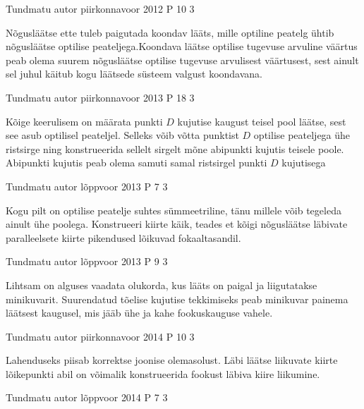 \documentclass[11pt]{article}
\begin{document}
{%
{Tundmatu autor} %
{piirkonnavoor} %
{2012} %
{P 10} %
{3} %
{

\ifHint
Nõgusläätse ette tuleb paigutada koondav lääts, mille optiline peatelg ühtib nõgusläätse optilise peateljega.Koondava läätse optilise tugevuse arvuline väärtus peab olema suurem nõgusläätse optilise tugevuse arvulisest väärtusest, sest ainult sel juhul käitub kogu läätsede süsteem valgust koondavana.
\fi
}


{Tundmatu autor} %
{piirkonnavoor} %
{2013} %
{P 18} %
{3} %
{

\ifHint
Kõige keerulisem on määrata punkti $D$ kujutise kaugust teisel pool läätse, sest see asub optilisel peateljel. Selleks võib võtta punktist $D$ optilise peateljega ühe ristsirge ning konstrueerida sellelt sirgelt mõne abipunkti kujutis teisele poole. Abipunkti kujutis peab olema samuti samal ristsirgel punkti $D$ kujutisega
\fi
}

{Tundmatu autor} %
{lõppvoor} %
{2013} %
{P 7} %
{3} %
{

\ifHint
Kogu pilt on optilise peatelje suhtes sümmeetriline, tänu millele võib tegeleda ainult ühe poolega. Konstrueeri kiirte käik, teades et kõigi nõgusläätse läbivate paralleelsete kiirte pikendused lõikuvad fokaaltasandil.
\fi
}

{Tundmatu autor} %
{lõppvoor} %
{2013} %
{P 9} %
{3} %
{

\ifHint
Lihtsam on alguses vaadata olukorda, kus lääts on paigal ja liigutatakse minikuvarit. Suurendatud tõelise kujutise tekkimiseks peab minikuvar painema läätsest kaugusel, mis jääb ühe ja kahe fookuskauguse vahele.
\fi
}

{Tundmatu autor} %
{piirkonnavoor} %
{2014} %
{P 10} %
{3} %
{

\ifHint
Lahenduseks piisab korrektse joonise olemasolust. Läbi läätse liikuvate kiirte lõikepunkti abil on võimalik konstrueerida fookust läbiva kiire liikumine.
\fi
}


{Tundmatu autor} %
{lõppvoor} %
{2014} %
{P 7} %
{3} %
{

}}
\end{document}
